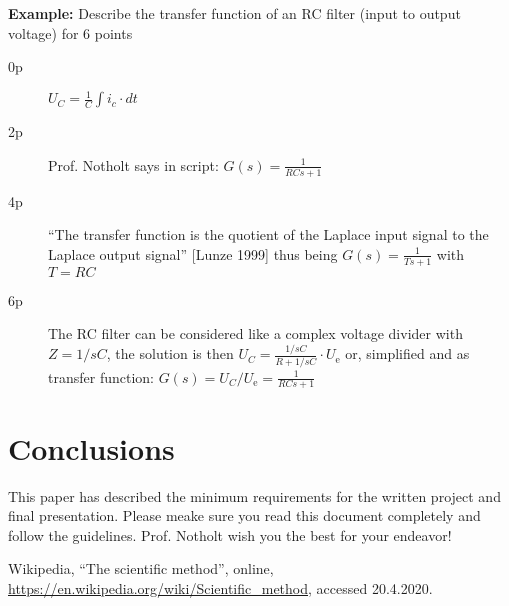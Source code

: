 \documentclass[a4paper, 10pt]{IEEEtran}
\begin{document}
	{\bfseries Example:} Describe the transfer function of an RC filter (input to output voltage) for 6 points
	
	\begin{description}
		\item[0p] $U_{C} = \frac{1}{C}\int i_{c} \cdot dt$
		\item[2p] Prof. Notholt says in script: $G(s) = \frac{1}{RCs+1}$
		\item[4p] ``The transfer function is the quotient of the Laplace input signal to the Laplace output signal'' [Lunze 1999] thus being $G(s) = \frac{1}{Ts+1}$ with $T=RC$
		\item[6p] The RC filter can be considered like a complex voltage divider with $Z = 1/sC$, the solution is then $U_{C} = \frac{1/sC}{R + 1/sC} \cdot U_\textrm{e}$ or, simplified and as transfer function: $G(s) = U_{C}/U_\textrm{e} = \frac{1}{RCs + 1}$ 
	\end{description}
	
	
	\section{Conclusions}
	
	This paper has described the minimum requirements for the written project and final presentation. Please meake sure you read this document completely and follow the guidelines. Prof. Notholt wish you the best for your endeavor!

	\begin{thebibliography}{1em}
		 Wikipedia, ``The scientific method'', online, \url{https://en.wikipedia.org/wiki/Scientific_method}, accessed 20.4.2020.
	\end{thebibliography}
	
\end{document}
